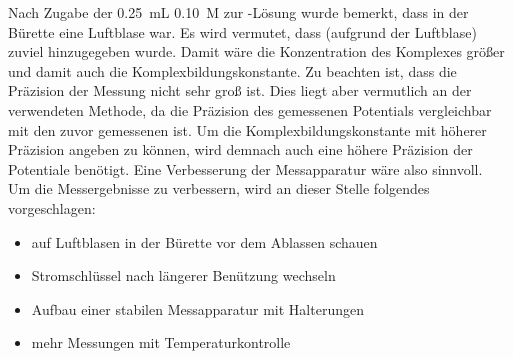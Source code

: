 \documentclass{article}
\begin{document}
        Nach Zugabe der \SI[mode=text]{0.25}{\milli\liter} \SI[mode=text]{0.10}{M}  zur -Lösung wurde bemerkt, dass in der Bürette eine Luftblase war. Es wird vermutet, dass (aufgrund der Luftblase) zuviel  hinzugegeben wurde. Damit wäre die Konzentration des Komplexes größer und damit auch die Komplexbildungskonstante. Zu beachten ist, dass die Präzision der Messung nicht sehr groß ist. Dies liegt aber vermutlich an der verwendeten Methode, da die Präzision des gemessenen Potentials vergleichbar mit den zuvor gemessenen ist. Um die Komplexbildungskonstante mit höherer Präzision angeben zu können, wird demnach auch eine höhere Präzision der Potentiale benötigt. Eine Verbesserung der Messapparatur wäre also sinnvoll. \\
        
        Um die Messergebnisse zu verbessern, wird an dieser Stelle folgendes vorgeschlagen: 
      
        \begin{itemize}
          \item auf Luftblasen in der Bürette vor dem Ablassen schauen
          \item Stromschlüssel nach längerer Benützung wechseln
          \item Aufbau einer stabilen Messapparatur mit Halterungen
          \item mehr Messungen mit Temperaturkontrolle
        \end{itemize}
        
  \pagebreak
  
  \listofreactions
  \printbibliography[title=Literaturverzeichnis]
  \listoffigures
  \listoftables
  
\end{document}
